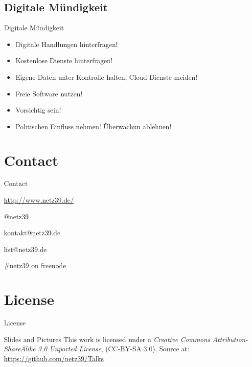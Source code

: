 \documentclass{beamer}
\begin{document}
\subsection{Digitale Mündigkeit}

\begin{frame}{Digitale Mündigkeit}
    \begin{itemize}
        \item Digitale Handlungen hinterfragen!
        \item Kostenlose Dienste hinterfragen!
        \item Eigene Daten unter Kontrolle halten, Cloud-Dienste meiden!
        \item Freie Software nutzen!
        \item Vorsichtig sein!
        \item Politischen Einfluss nehmen! Überwachun ablehnen!
    \end{itemize}
\end{frame}

\section{Contact}

\begin{frame}{Contact}
    \begin{center}
        \begin{description}
            \item[WWW] \url{http://www.netz39.de/}
            \item[Twitter/identi.ca] @netz39
            \item[E-Mail] kontakt@netz39.de
            \item[Mailingliste] list@netz39.de
            \item[IRC] \#netz39 on freenode
        \end{description}
    \end{center}
\end{frame}

\appendix

\section{License}

\begin{frame}{License}
    \begin{block}{Slides and Pictures}
        This work is licensed under a \emph{Creative Commons
        Attribution-ShareAlike 3.0 Unported License}, (CC-BY-SA 3.0).
        Source at: \url{https://github.com/netz39/Talks}
    \end{block}
\end{frame}
\end{document}
